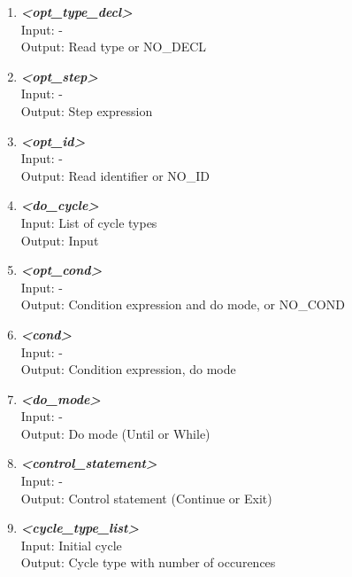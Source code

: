 \documentclass[a4paper, 11pt]{article}
\begin{document}
\begin{enumerate}
\item \textbf{\textit{<opt\_type\_decl>}} \\
Input: \hspace{3.288mm} - \\
Output: \enspace Read type or NO\_DECL

\item \textbf{\textit{<opt\_step>}} \\
Input: \hspace{3.288mm} - \\
Output: \enspace Step expression

\item \textbf{\textit{<opt\_id>}} \\
Input: \hspace{3.288mm} - \\
Output: \enspace Read identifier or NO\_ID

\item \textbf{\textit{<do\_cycle>}} \\
Input: \hspace{3.288mm} List of cycle types \\
Output: \enspace Input

\item \textbf{\textit{<opt\_cond>}} \\
Input: \hspace{3.288mm} - \\
Output: \enspace Condition expression and do mode,  or NO\_COND

\item \textbf{\textit{<cond>}} \\
Input: \hspace{3.288mm} - \\
Output: \enspace Condition expression, do mode

\item \textbf{\textit{<do\_mode>}} \\
Input: \hspace{3.288mm} - \\
Output: \enspace Do mode (Until or While)

\item \textbf{\textit{<control\_statement>}} \\
Input: \hspace{3.288mm} - \\
Output: \enspace Control statement (Continue or Exit)

\item \textbf{\textit{<cycle\_type\_list>}} \\
Input: \hspace{3.288mm} Initial cycle  \\
Output: \enspace Cycle type with number of occurences


\end{enumerate}
\end{document}
